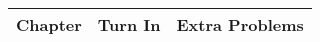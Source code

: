 \documentclass[12pt]{article}
\begin{document}
\begin{center}
\begin{tabular}{|c|c||c|}
\hline
Chapter & Turn In & Extra Problems\\
\hline



%




%


\end{tabular}
\end{center}
\end{document}
